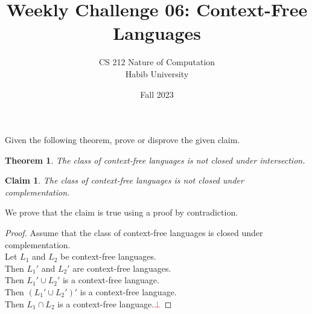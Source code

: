 \documentclass[a4paper]{exam}
\title{Weekly Challenge 06: Context-Free Languages}
\author{CS 212 Nature of Computation\\Habib University}
\date{Fall 2023}
\theoremstyle{theorem}
\newtheorem{theorem}{Theorem}
\theoremstyle{claim}
\newtheorem{claim}{Claim}
\begin{document}
\maketitle

\begin{questions}


  Given the following theorem, prove or disprove the given claim.

  \begin{theorem}
    The class of context-free languages is not closed under intersection.
  \end{theorem}
  \begin{claim}
    The class of context-free languages is not closed under complementation.
  \end{claim}

  \begin{solution}
    We prove that the claim is true using a proof by contradiction.

    \begin{proof}
      Assume that the class of context-free languages is closed under complementation.\\
      Let $L_1$ and $L_2$ be context-free languages.\\
      Then $L_1'$ and $L_2'$ are context-free languages.\\
      Then $L_1'\cup L_2'$ is a context-free language.\\
      Then $(L_1'\cup L_2')'$ is a context-free language.\\
      Then $L_1\cap L_2$ is a context-free language.\qquad \textcolor{red}{$\bot$}
    \end{proof}
  \end{solution}
  
\end{questions}
\end{document}
